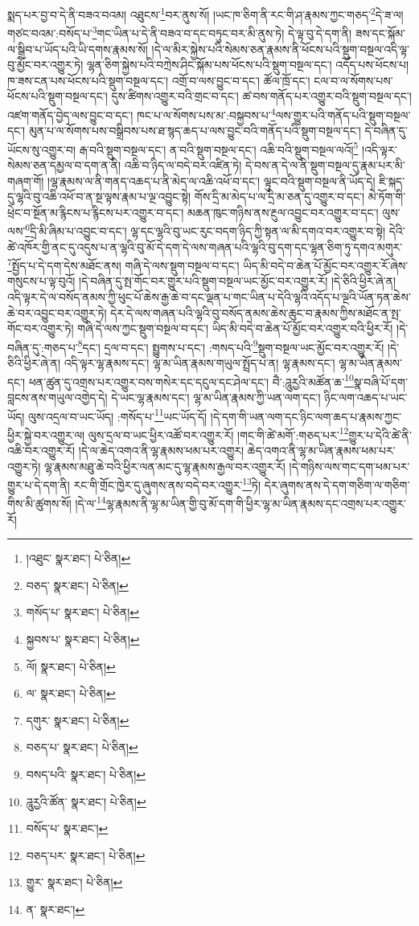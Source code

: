 སྨད་པར་བྱ་བ་དེ་ནི་བཟའ་བའམ། འཐུངས་\footnote{།འཐུང་  སྣར་ཐང་།  པེ་ཅིན། }བར་ནུས་སོ། །ཡང་ཁ་ཅིག་ནི་རང་གི་ཤ་རྣམས་ཀྱང་གཅད་\footnote{བཅད་  སྣར་ཐང་།  པེ་ཅིན། }དེ་ཟ་ལ། གཙང་བའམ་:བསོད་པ་\footnote{གསོད་པ་  སྣར་ཐང་།  པེ་ཅིན། }གང་ཡིན་པ་དེ་ནི་བཟའ་བ་དང་བཏུང་བར་མི་ནུས་ཏེ། དེ་ལྟ་བུ་དེ་དག་ནི། ཟས་དང་སྐོམ་ལ་སྒྲིབ་པ་ཡོད་པའི་ཡི་དགས་རྣམས་སོ། །དེ་ལ་མིར་སྐྱེས་པའི་སེམས་ཅན་རྣམས་ནི་ཕོངས་པའི་སྡུག་བསྔལ་འདི་ལྟ་བུ་མྱོང་བར་འགྱུར་ཏེ། ལྷན་ཅིག་སྐྱེས་པའི་བཀྲེས་ཤིང་སྐོམ་པས་ཕོངས་པའི་སྡུག་བསྔལ་དང་། འདོད་པས་ཕོངས་པ། ཁ་ཟས་ངན་པས་ཕོངས་པའི་སྡུག་བསྔལ་དང་། འགྲོ་བ་ལས་བྱུང་བ་དང་། ཚོལ་ཁྲོ་དང་། ངལ་བ་ལ་སོགས་པས་ཕོངས་པའི་སྡུག་བསྔལ་དང་། དུས་ཚིགས་འགྱུར་བའི་གྲང་བ་དང་། ཚ་བས་གནོད་པར་འགྱུར་བའི་སྡུག་བསྔལ་དང་། འཛག་གནོད་བྱེད་ལས་བྱུང་བ་དང་། ཁང་པ་ལ་སོགས་པས་མ་:བསྐྱབས་པ་\footnote{སྐྱབས་པ་  སྣར་ཐང་།  པེ་ཅིན། }ལས་གྱུར་པའི་གནོད་པའི་སྡུག་བསྔལ་དང་། མུན་པ་ལ་སོགས་པས་བསྒྲིབས་པས་ཐ་སྙད་ཆད་པ་ལས་བྱུང་བའི་གནོད་པའི་སྡུག་བསྔལ་དང་། དེ་བཞིན་དུ་ཡོངས་སུ་འགྱུར་བ། རྒ་བའི་སྡུག་བསྔལ་དང་། ན་བའི་སྡུག་བསྔལ་དང་། འཆི་བའི་སྡུག་བསྔལ་ལའོ།\footnote{ལོ།  སྣར་ཐང་།  པེ་ཅིན། } །འདི་ལྟར་སེམས་ཅན་དམྱལ་བ་དག་ན་ནི། འཆི་བ་ཉིད་ལ་བདེ་བར་འཛིན་ཏེ། དེ་བས་ན་དེ་ལ་ནི་སྡུག་བསྔལ་དུ་རྣམ་པར་མི་གཞག་གོ། །ལྷ་རྣམས་ལ་ནི་གནད་འཆད་པ་ནི་མེད་ལ་འཆི་འཕོ་བ་དང་། ལྟུང་བའི་སྡུག་བསྔལ་ནི་ཡོད་དེ། ཇི་སྐད་དུ་ལྷའི་བུ་འཆི་འཕོ་བ་ན་སྔ་ལྟས་རྣམ་པ་ལྔ་འབྱུང་སྟེ། གོས་དྲི་མ་མེད་པ་ལ་དྲི་མ་ཅན་དུ་འགྱུར་བ་དང་། མེ་ཏོག་གི་ཕྲེང་བ་སྔོན་མ་རྙིངས་པ་རྙིངས་པར་འགྱུར་བ་དང་། མཆན་ཁུང་གཉིས་ནས་རྔུལ་འབྱུང་བར་འགྱུར་བ་དང་། ལུས་ལས་\footnote{ལ་  སྣར་ཐང་།  པེ་ཅིན། }དྲི་མི་ཞིམ་པ་འབྱུང་བ་དང་། ལྷ་དང་ལྷའི་བུ་ཡང་རུང་བདག་ཉིད་ཀྱི་སྟན་ལ་མི་དགའ་བར་འགྱུར་བ་སྟེ། དེའི་ཚེ་འཁོར་གྱི་ནང་དུ་འདུས་པ་ན་ལྷའི་བུ་མོ་དེ་དག་དེ་ལས་གཞན་པའི་ལྷའི་བུ་དག་དང་ལྷན་ཅིག་ཏུ་དགའ་མགུར་\footnote{དགུར་  སྣར་ཐང་།  པེ་ཅིན། }སྤྱོད་པ་དེ་དག་དེས་མཐོང་ནས། གཞི་དེ་ལས་སྡུག་བསྔལ་བ་དང་། ཡིད་མི་བདེ་བ་ཆེན་པོ་མྱོང་བར་འགྱུར་རོ་ཞེས་གསུངས་པ་ལྟ་བུའོ། །དེ་བཞིན་དུ་སྤ་གོང་བར་གྱུར་པའི་སྡུག་བསྔལ་ཡང་མྱོང་བར་འགྱུར་རོ། །དེ་ཅིའི་ཕྱིར་ཞེ་ན། འདི་ལྟར་དེ་ལ་བསོད་ནམས་ཀྱི་ཕུང་པོ་ཆེས་རྒྱ་ཆེ་བ་དང་ལྡན་པ་གང་ཡིན་པ་དེའི་ལྷའི་འདོད་པ་ལྔའི་ཡོན་ཏན་ཆེས་ཆེ་བར་འབྱུང་བར་འགྱུར་ཏེ། དེར་དེ་ལས་གཞན་པའི་ལྷའི་བུ་བསོད་ནམས་ཆེས་ཆུང་བ་རྣམས་ཀྱིས་མཐོང་ན་སྤ་གོང་བར་འགྱུར་ཏེ། གཞི་དེ་ལས་ཀྱང་སྡུག་བསྔལ་བ་དང་། ཡིད་མི་བདེ་བ་ཆེན་པོ་མྱོང་བར་འགྱུར་བའི་ཕྱིར་རོ། །དེ་བཞིན་དུ་:གཅད་པ་\footnote{བཅད་པ་  སྣར་ཐང་།  པེ་ཅིན། }དང་། དྲལ་བ་དང་། སྤྱུགས་པ་དང་། :གསད་པའི་\footnote{བསད་པའི་  སྣར་ཐང་།  པེ་ཅིན། }སྡུག་བསྔལ་ཡང་མྱོང་བར་འགྱུར་རོ། །དེ་ཅིའི་ཕྱིར་ཞེ་ན། འདི་ལྟར་ལྷ་རྣམས་དང་། ལྷ་མ་ཡིན་རྣམས་གཡུལ་སྤྲོད་པ་ན། ལྷ་རྣམས་དང་། ལྷ་མ་ཡིན་རྣམས་དང་། ཕན་ཚུན་དུ་འགྲས་པར་འགྱུར་བས་གསེར་དང་དངུལ་དང་ཤེལ་དང་། བཻ་:ཌཱུརྱའི་མཚོན་ཆ་\footnote{ཌཱུརྱའི་ཚོན་  སྣར་ཐང་།  པེ་ཅིན། }སྣ་བཞི་པོ་དག་བླངས་ནས་གཡུལ་འགྱེད་དེ། དེ་ཡང་ལྷ་རྣམས་དང་། ལྷ་མ་ཡིན་རྣམས་ཀྱི་ཡན་ལག་དང་། ཉིང་ལག་འཆད་པ་ཡང་ཡོད། ལུས་འདྲལ་བ་ཡང་ཡོད། :གསོད་པ་\footnote{བསོད་པ་  སྣར་ཐང་། }ཡང་ཡོད་དོ། །དེ་དག་གི་ཡན་ལག་དང་ཉིང་ལག་ཆད་པ་རྣམས་ཀྱང་ཕྱིར་སྐྱེ་བར་འགྱུར་ལ། ལུས་དྲལ་བ་ཡང་ཕྱིར་འཚོ་བར་འགྱུར་རོ། །གང་གི་ཚེ་མགོ་:གཅད་པར་\footnote{བཅད་པར་  སྣར་ཐང་།  པེ་ཅིན། }གྱུར་པ་དེའི་ཚེ་ནི་འཆི་བར་འགྱུར་རོ། །དེ་ལ་ཆེད་འགའ་ནི་ལྷ་རྣམས་ཕམ་པར་འགྱུར། ཆེད་འགའ་ནི་ལྷ་མ་ཡིན་རྣམས་ཕམ་པར་འགྱུར་ཏེ། ལྷ་རྣམས་མཐུ་ཆེ་བའི་ཕྱིར་ལན་མང་དུ་ལྷ་རྣམས་རྒྱལ་བར་འགྱུར་རོ། །དེ་གཉིས་ལས་གང་དག་ཕམ་པར་གྱུར་པ་དེ་དག་ནི། རང་གི་གྲོང་ཁྱེར་དུ་ཞུགས་ནས་བདེ་བར་འགྱུར་\footnote{གྱུར་  སྣར་ཐང་།  པེ་ཅིན། }ཏེ། དེར་ཞུགས་ནས་དེ་དག་གཅིག་ལ་གཅིག་གིས་མི་ཚུགས་སོ། །དེ་ལ་\footnote{ན་  སྣར་ཐང་། }ལྷ་རྣམས་ནི་ལྷ་མ་ཡིན་གྱི་བུ་མོ་དག་གི་ཕྱིར་ལྷ་མ་ཡིན་རྣམས་དང་འགྲས་པར་འགྱུར་རོ། 